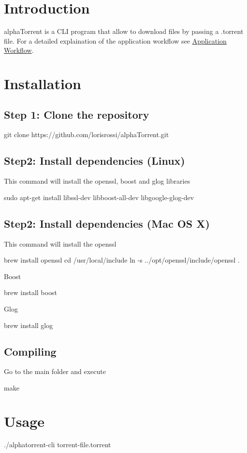\hypertarget{index_intro_sec}{}\section{Introduction}\label{index_intro_sec}
alpha\+Torrent is a C\+LI program that allow to download files by passing a .torrent file. For a detailed explaination of the application workflow see \hyperlink{workflow}{Application Workflow}. \hypertarget{index_install_sec}{}\section{Installation}\label{index_install_sec}
\hypertarget{index_step1}{}\subsection{Step 1\+: Clone the repository}\label{index_step1}

\begin{DoxyCode}
git clone https:\textcolor{comment}{//github.com/lorisrossi/alphaTorrent.git }
\end{DoxyCode}
\hypertarget{index_step21}{}\subsection{Step2\+: Install dependencies (\+Linux)}\label{index_step21}
This command will install the openssl, boost and glog libraries 
\begin{DoxyCode}
sudo apt-\textcolor{keyword}{get} install libssl-dev libboost-all-dev libgoogle-glog-dev 
\end{DoxyCode}
\hypertarget{index_step22}{}\subsection{Step2\+: Install dependencies (\+Mac O\+S X)}\label{index_step22}
This command will install the openssl 
\begin{DoxyCode}
brew install openssl 
cd /usr/local/include 
ln -s ../opt/openssl/include/openssl . 
\end{DoxyCode}
 Boost 
\begin{DoxyCode}
brew install boost 
\end{DoxyCode}
 Glog 
\begin{DoxyCode}
brew install glog 
\end{DoxyCode}
\hypertarget{index_compiling}{}\subsection{Compiling}\label{index_compiling}
Go to the main folder and execute 
\begin{DoxyCode}
make 
\end{DoxyCode}
\hypertarget{index_usage}{}\section{Usage}\label{index_usage}

\begin{DoxyCode}
./alphatorrent-cli torrent-file.torrent 
\end{DoxyCode}
 